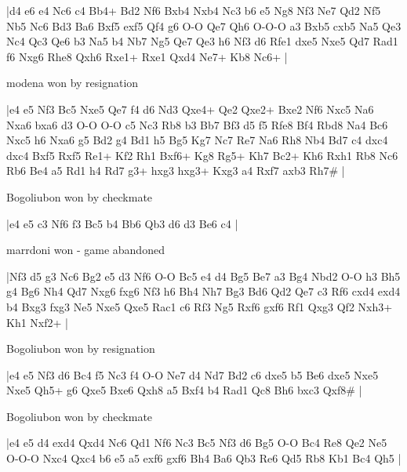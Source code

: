 \makegametitle
|d4 e6 e4 Nc6 c4 Bb4+ Bd2 Nf6 Bxb4 Nxb4 Nc3 b6 e5 Ng8 Nf3 Ne7 Qd2 Nf5 Nb5 Nc6 Bd3 Ba6 Bxf5 exf5 Qf4 g6 O-O Qe7 Qh6 O-O-O a3 Bxb5 cxb5 Na5 Qe3 Nc4 Qc3 Qe6 b3 Na5 b4 Nb7 Ng5 Qe7 Qe3 h6 Nf3 d6 Rfe1 dxe5 Nxe5 Qd7 Rad1 f6 Nxg6 Rhe8 Qxh6 Rxe1+ Rxe1 Qxd4 Ne7+ Kb8 Nc6+  |

\showboard

modena won by resignation

\makegametitle
|e4 e5 Nf3 Bc5 Nxe5 Qe7 f4 d6 Nd3 Qxe4+ Qe2 Qxe2+ Bxe2 Nf6 Nxc5 Na6 Nxa6 bxa6 d3 O-O O-O c5 Nc3 Rb8 b3 Bb7 Bf3 d5 f5 Rfe8 Bf4 Rbd8 Na4 Bc6 Nxc5 h6 Nxa6 g5 Bd2 g4 Bd1 h5 Bg5 Kg7 Nc7 Re7 Na6 Rh8 Nb4 Bd7 c4 dxc4 dxc4 Bxf5 Rxf5 Re1+ Kf2 Rh1 Bxf6+ Kg8 Rg5+ Kh7 Bc2+ Kh6 Rxh1 Rb8 Nc6 Rb6 Be4 a5 Rd1 h4 Rd7 g3+ hxg3 hxg3+ Kxg3 a4 Rxf7 axb3 Rh7\#  |

\showboard

Bogoliubon won by checkmate

\makegametitle
|e4 e5 c3 Nf6 f3 Bc5 b4 Bb6 Qb3 d6 d3 Be6 c4  |

\showboard

marrdoni won - game abandoned

\makegametitle
|Nf3 d5 g3 Nc6 Bg2 e5 d3 Nf6 O-O Bc5 e4 d4 Bg5 Be7 a3 Bg4 Nbd2 O-O h3 Bh5 g4 Bg6 Nh4 Qd7 Nxg6 fxg6 Nf3 h6 Bh4 Nh7 Bg3 Bd6 Qd2 Qe7 c3 Rf6 cxd4 exd4 b4 Bxg3 fxg3 Ne5 Nxe5 Qxe5 Rac1 c6 Rf3 Ng5 Rxf6 gxf6 Rf1 Qxg3 Qf2 Nxh3+ Kh1 Nxf2+  |

\showboard

Bogoliubon won by resignation

\makegametitle
|e4 e5 Nf3 d6 Bc4 f5 Nc3 f4 O-O Ne7 d4 Nd7 Bd2 c6 dxe5 b5 Be6 dxe5 Nxe5 Nxe5 Qh5+ g6 Qxe5 Bxe6 Qxh8 a5 Bxf4 b4 Rad1 Qc8 Bh6 bxc3 Qxf8\#  |

\showboard

Bogoliubon won by checkmate

\makegametitle
|e4 e5 d4 exd4 Qxd4 Nc6 Qd1 Nf6 Nc3 Bc5 Nf3 d6 Bg5 O-O Bc4 Re8 Qe2 Ne5 O-O-O Nxc4 Qxc4 b6 e5 a5 exf6 gxf6 Bh4 Ba6 Qb3 Re6 Qd5 Rb8 Kb1 Bc4 Qh5  |

